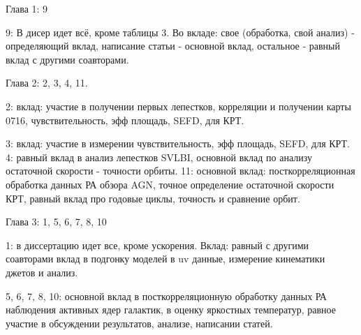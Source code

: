 {\contribution}

Глава 1: 9

9: В дисер идет всё, кроме таблицы 3.
Во вкладе: свое (обработка, свой анализ) - определяющий вклад, написание статьи - основной вклад,
остальное - равный вклад  с другими соавторами.

Глава 2: 2, 3, 4, 11.

2: вклад: участие в получении первых лепестков, корреляции и получении карты 0716, чувствительность,
эфф площадь, SEFD, для КРТ.

3: вклад: участие в измерении чувствительность, эфф площадь, SEFD, для КРТ.
4: равный вклад в анализ лепестков SVLBI, основной вклад по анализу остаточной скорости - точности
орбиты.
11: основной вклад: посткорреляционная обработка данных РА обзора AGN, точное определение остаточной
скорости КРТ, равный вклад про годовые циклы, точность и сравнение орбит.

Глава 3: 1, 5, 6, 7, 8, 10

1: в диссертацию идет все, кроме ускорения.
Вклад: равный с другими соавторами вклад в подгонку моделей в uv данные, измерение кинематики джетов
и анализ.

5, 6, 7, 8, 10: основной вклад в посткорреляционную обработку данных РА наблюдения активных ядер
галактик, в оценку яркостных температур, равное участие в обсуждении результатов, анализе, написании
статей.



%
%
